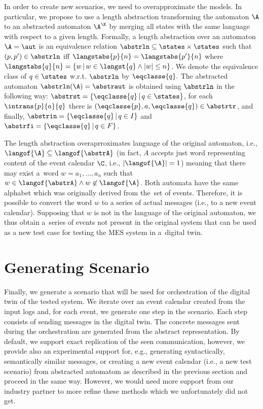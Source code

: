 {In order to create new scenarios, we need to overapproximate the models. In
particular, we propose to use a length abstraction transforming the automaton
$\A$ to an abstracted automaton $\A^\K$ by merging all states with the same
language with respect to a given length.
%
Formally, a length abstraction over an automaton $\A=\aut$ is an equivalence
relation $\abstrln \subseteq \states\times \states$ such that $(p,p')\in
\abstrln$ iff $\langstabs{p}{n}=\langstabs{p'}{n}$ where $\langstabs{q}{n}=\{w\,|\, w \in \langst{q} \wedge |w| \leq n\}$.
We denote the equivalence class of $q\in\states$ w.r.t. $\abstrln$ by $\eqclasse{q}.$ The abstracted automaton
$\abstrln(\A)=\abstraut$ is obtained using $\abstrln$ in the following way:
$\abstrst=\{\eqclasse{q}\,|\,q\in\states\}$, for each $\intrans{p}{a}{q}$ there
is $(\eqclasse{p}, a, \eqclasse{q}) \in \abstrtr$, and finally,
$\abstrin=\{\eqclasse{q}\,|\,q\in I\}$ and $\abstrfi=\{\eqclasse{q}\,|\,q\in
F\}$.

The length abstraction overaprroximates language of the original automaton, i.e.,
$\langof{\A}\subseteq\langof{\abstrA}$ (in fact, $A$ accepts just word representing content of the event calendar $\C$,
i.e., $|\langof{\A}|=1$)
meaning that there may exist a~word
$w=a_1,\ldots,a_n$ such that $w\in\langof{\abstrA} \wedge w\not\in\langof{\A}$.
Both automata have the same alphabet which was originally derived from the~set of
events.  Therefore, it is possible to convert the word $w$ to a series of actual
messages (i.e., to a new event calendar).  Supposing that $w$ is not in the language of the original automaton,
we thus obtain a~series of events not present in the original system that can
be used as a new test case for testing the MES system in a~digital twin.

\section{Generating Scenario}
\label{sec:scenario}

Finally, we generate a scenario that will be used for orchestration of the
digital twin of the tested system.
%
We iterate over an event calendar created from the input logs and, for each event, we generate one step in
the scenario.
%
Each step consists of sending messages in the digital twin.
%
The concrete messages sent during the orchestration are generated from the
abstract representation.
%
By default, we support exact replication of the seen communication, however, we
provide also an experimental support for, e.g., generating syntactically,
semantically similar messages, or creating a new event calendar (i.e., a new test scenario)
from abstracted automatom as described in the previous section and proceed in the same way.
However, we would need more support from our industry partner to more refine these methods
which we unfortunately did not get.

}

